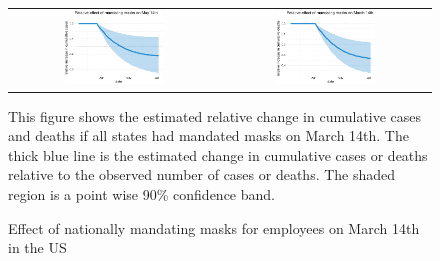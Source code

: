 \documentclass[11pt,reqno,letter]{amsart}
\theoremstyle{definition}
\begin{document}
\begin{figure}[ht]
  \caption{Effect  of nationally mandating masks for employees on March
    14th in the US \label{fig:US-mask-dgrowth}}
  \begin{minipage}{\linewidth}
    \centering
    \medskip
    \begin{tabular}{cc}
      \includegraphics[width=0.49\textwidth]{tables_and_figures/us-mask-rcumu_idx}
      & \includegraphics[width=0.49\textwidth]{tables_and_figures/us-mask-rcumu_deaths_idx}
    \end{tabular}
    \begin{flushleft}
      \footnotesize This figure shows the estimated relative change in
      cumulative cases and deaths if all states had mandated masks on
      March 14th. The thick blue line is the estimated change in
      cumulative cases or deaths relative to the observed number of
      cases or deaths. The shaded region is a point wise 90\%
      confidence band.
    \end{flushleft}
  \end{minipage}
\end{figure}
\end{document}
